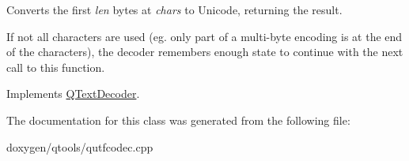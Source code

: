 Converts the first {\itshape len} bytes at {\itshape chars} to Unicode, returning the result.

If not all characters are used (eg. only part of a multi-\/byte encoding is at the end of the characters), the decoder remembers enough state to continue with the next call to this function. 

Implements \mbox{\hyperlink{class_q_text_decoder_aec543f7f6670dfda14164268e2da879d}{Q\+Text\+Decoder}}.



The documentation for this class was generated from the following file\+:\begin{DoxyCompactItemize}
\item 
doxygen/qtools/qutfcodec.\+cpp\end{DoxyCompactItemize}
